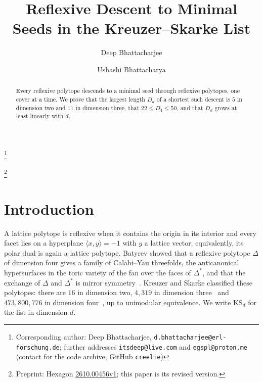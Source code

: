 \documentclass[11pt]{amsart}
\theoremstyle{definition}
\theoremstyle{remark}
\newcommand{\KS}{\mathrm{KS}}
\newcommand{\ip}[2]{\langle #1,#2\rangle}
\newcommand{\UBs}{50}
\begin{document}
\title{Reflexive Descent to Minimal Seeds in the Kreuzer--Skarke List}

\author{Deep Bhattacharjee}
\address{Formerly, Electro-Gravitational Space Propulsion Laboratory (EGSPL), Bhubaneswar, Odisha 751030, India}
\address{Formerly, University of Calcutta (Heramba Chandra College), 23/49 Gariahat Road, Golpark, Kolkata 700029, West Bengal, India}
\thanks{Corresponding author: Deep Bhattacharjee, \nolinkurl{d.bhattacharjee@erl-forschung.de}; further addresses \nolinkurl{itsdeep@live.com} and \nolinkurl{egspl@proton.me} (contact for the code archive, GitHub \nolinkurl{creelie})}

\thanks{Preprint: Hexagon \href{https://hexagonmath.org/2610.00456v1}{2610.00456v1}; this paper is its revised version.}

\author{Ushashi Bhattacharya}
\address{Formerly, National Taiwan University, Taipei 106319, Taiwan}


\begin{abstract}
Every reflexive polytope descends to a minimal seed through reflexive
polytopes, one cover at a time. We prove that the largest length $D_d$ of
a shortest such descent is $5$ in dimension two and $11$ in dimension
three, that $22\le D_4\le\UBs$, and that $D_d$ grows at least linearly
with $d$.
\end{abstract}

\maketitle

\section{Introduction}\label{sec:intro}

A lattice polytope is reflexive when it contains the origin in its
interior and every facet lies on a hyperplane $\ip{x}{y}=-1$ with $y$ a
lattice vector; equivalently, its polar dual is again a lattice polytope.
Batyrev showed that a reflexive polytope $\Delta$ of dimension four gives a
family of Calabi--Yau threefolds, the anticanonical hypersurfaces in the
toric variety of the fan over the faces of $\Delta^*$, and that the
exchange of $\Delta$ and $\Delta^*$ is mirror symmetry~\cite{Bat94}.
Kreuzer and Skarke classified these polytopes: there are $16$ in dimension
two, $4{,}319$ in dimension three~\cite{KS98} and $473{,}800{,}776$ in
dimension four~\cite{KS00}, up to unimodular equivalence. We write $\KS_d$
for the list in dimension $d$.
\end{document}
